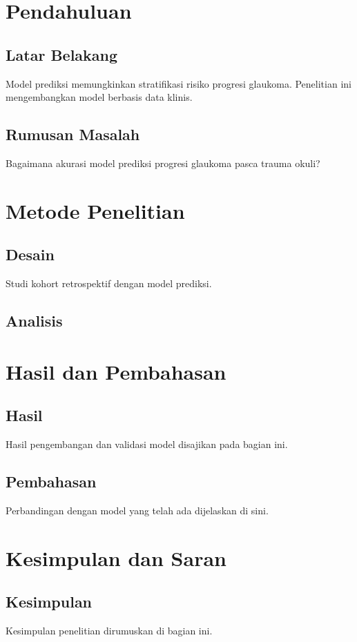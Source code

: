 \documentclass[12pt]{report}
\newcommand{\frameworkRoot}{../../}
\begin{document}
\makecover[][Disertasi]



\chapter{Pendahuluan}
\section{Latar Belakang}
Model prediksi memungkinkan stratifikasi risiko progresi glaukoma.\supercite{kusumaEfektivitasTrabekulektomi2021} Penelitian ini mengembangkan model berbasis data klinis.

\section{Rumusan Masalah}
Bagaimana akurasi model prediksi progresi glaukoma pasca trauma okuli?

\chapter{Metode Penelitian}
\section{Desain}
Studi kohort retrospektif dengan model prediksi.

\section{Analisis}

\chapter{Hasil dan Pembahasan}
\section{Hasil}
Hasil pengembangan dan validasi model disajikan pada bagian ini.

\section{Pembahasan}
Perbandingan dengan model yang telah ada dijelaskan di sini.

\chapter{Kesimpulan dan Saran}
\section{Kesimpulan}
Kesimpulan penelitian dirumuskan di bagian ini.

\printbibliography[title={Daftar Pustaka}]
\end{document}
